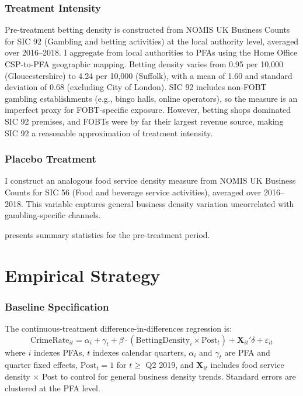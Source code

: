 \documentclass[12pt]{article}
\begin{document}
\subsubsection*{Treatment Intensity} Pre-treatment betting density is constructed from NOMIS UK Business Counts for SIC 92 (Gambling and betting activities) at the local authority level, averaged over 2016--2018. I aggregate from local authorities to PFAs using the Home Office CSP-to-PFA geographic mapping. Betting density varies from 0.95 per 10,000 (Gloucestershire) to 4.24 per 10,000 (Suffolk), with a mean of 1.60 and standard deviation of 0.68 (excluding City of London). SIC 92 includes non-FOBT gambling establishments (e.g., bingo halls, online operators), so the measure is an imperfect proxy for FOBT-specific exposure. However, betting shops dominated SIC 92 premises, and FOBTs were by far their largest revenue source, making SIC 92 a reasonable approximation of treatment intensity.

\subsubsection*{Placebo Treatment} I construct an analogous food service density measure from NOMIS UK Business Counts for SIC 56 (Food and beverage service activities), averaged over 2016--2018. This variable captures general business density variation uncorrelated with gambling-specific channels.

 presents summary statistics for the pre-treatment period.


\section{Empirical Strategy}

\subsubsection*{Baseline Specification} The continuous-treatment difference-in-differences regression is:
\begin{equation}
\text{CrimeRate}_{it} = \alpha_i + \gamma_t + \beta \cdot (\text{BettingDensity}_i \times \text{Post}_t) + \mathbf{X}_{it}'\delta + \varepsilon_{it}
\label{eq:did}
\end{equation}
where $i$ indexes PFAs, $t$ indexes calendar quarters, $\alpha_i$ and $\gamma_t$ are PFA and quarter fixed effects, $\text{Post}_t = 1$ for $t \geq$ Q2 2019, and $\mathbf{X}_{it}$ includes food service density $\times$ Post to control for general business density trends. Standard errors are clustered at the PFA level.
\end{document}
